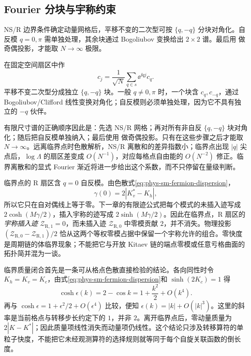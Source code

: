 \subsection{Fourier 分块与宇称约束}

NS/R 边界条件确定动量网格后，平移不变的二次型可按 $\{q,-q\}$ 分块对角化。自反模 $q=0,\pi$ 需单独处理，其余块通过 Bogoliubov 变换给出 $2\times2$ 谱。最后用 做奇偶投影，才能取 $N\to\infty$ 极限。

在固定空间扇区中作
\begin{equation}
 c_j=\frac1{\sqrt N}
 \sum_{q\in s}\ee^{\ii qj}c_q.
 \label{eq:phys-sm-fermion-fourier}
\end{equation}
平移不变二次型分成独立 \(\{q,-q\}\) 块。一般 \(q\neq0,\pi\) 时，一个块含 \(c_q,c_{-q}\)，通过 Bogoliubov/Clifford 线性变换对角化；自反模则必须单独处理，因为它不具有独立的 \(-q\) 伙伴。

有限尺寸谱的正确顺序因此是：先选 NS/R 网格；再对所有非自反 \(\{q,-q\}\) 块对角化；随后把自反模单独纳入；最后使用 做奇偶投影。只有在这些步骤之后才能取 \(N\to\infty\)。远离临界点时色散解析，NS/R 离散和的差异指数小；临界点出现 \(|q|\) 尖点后，\(\log\Lambda\) 的扇区差变成 \(O(N^{-1})\)，对应每格点自由能的 \(O(N^{-2})\) 修正。临界离散和的显式 Fourier 渐近将进一步给出这个系数，而不只停留在量级判断。

临界点的 R 扇区含 \(q=0\) 自反模。由色散式\cref{eq:phys-sm-fermion-dispersion}，
\[
\gamma(0)=2|K_v^*-K_h|,
\]
所以它只在自对偶线上等于零。下一章的有限迹公式把每个模式的未插入迹写成 \(2\cosh(M\gamma/2)\)，插入宇称的迹写成 \(2\sinh(M\gamma/2)\)。因此在临界点，R 扇区的\emph{宇称插入迹} \(\mathcal Z_{\mathrm R,1}=0\)，而未插入迹 \(\mathcal Z_{\mathrm R,0}\) 中零模贡献 \(2\)，并不消失。物理投影
\((\mathcal Z_{\mathrm R,0}-\mathcal Z_{\mathrm R,1})/2\)
恰从这两个等权零模占据中保留一个宇称允许的组合。零快度是周期链的体临界现象；不能把它与开放 Kitaev 链的端点零模或任意亏格曲面的拓扑简并混为一谈。

临界质量闭合首先是一条可从格点色散直接检验的结论。各向同性时令 \(K_h=K_v=K_c\)，由式\cref{eq:phys-sm-fermion-dispersion}和 \(\sinh(2K_c)=1\) 得
\[
\cosh\epsilon(k)=2-\cos k
=1+\frac{k^2}{2}+O(k^4).
\]
再与 \(\cosh\epsilon=1+\epsilon^2/2+O(\epsilon^4)\) 比较，便知 \(\epsilon(k)=|k|+O(|k|^3)\)。这里的斜率是当前格点与转移步长约定下的 \(1\)，并非 \(2\)。离开临界点后，零动量质量为 \(2|K-K^*|\)；因此质量项线性消失而动量项仍线性。这个结论只涉及转移算符的单粒子快度，不能把它未经观测算符的选择规则就等同于每个自旋关联函数的倒长度。

